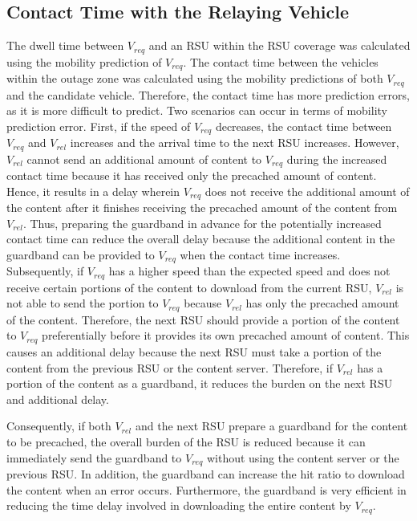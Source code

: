 \documentclass[electronics,aricle,accept,pdftex,moreauthors]{Definitions/mdpi}
\begin{document}
\subsection{Contact Time with the Relaying Vehicle} \label{sec4.2}
The dwell time between ${V}_{req}$ and an RSU within the RSU coverage was calculated using the mobility prediction of ${V}_{req}$. The contact time between the vehicles within the outage zone was calculated using the mobility predictions of both ${V}_{req}$ and the candidate vehicle. Therefore, the contact time has more prediction errors, as it is more difficult to predict. Two scenarios can occur in terms of mobility prediction error. First, if the speed of ${V}_{req}$ decreases, the contact time between ${V}_{req}$ and ${V}_{rel}$ increases and the arrival time to the next RSU increases. However, ${V}_{rel}$ cannot send an additional amount of content to ${V}_{req}$ during the increased contact time because it has received only the precached amount of content. Hence, it results in a delay wherein ${V}_{req}$ does not receive the additional amount of the content after it finishes receiving the precached amount of the content from ${V}_{rel}$. Thus, preparing the guardband in advance for the potentially increased contact time can reduce the overall delay because the additional content in the guardband can be provided to ${V}_{req}$ when the contact time increases. Subsequently, if ${V}_{req}$ has a higher speed than the expected speed and does not receive certain portions of the content to download from the current RSU, ${V}_{rel}$ is not able to send the portion to ${V}_{req}$ because ${V}_{rel}$ has only the precached amount of the content. Therefore, the next RSU should provide a portion of the content to ${V}_{req}$ preferentially before it provides its own precached amount of content. This causes an additional delay because the next RSU must take a portion of the content from the previous RSU or the content server. Therefore, if ${V}_{rel}$ has a portion of the content as a guardband, it reduces the burden on the next RSU and additional delay.

Consequently, if both ${V}_{rel}$ and the next RSU prepare a guardband for the content to be precached, the overall burden of the RSU is reduced because it can immediately send the guardband to ${V}_{req}$ without using the content server or the previous RSU. In addition, the guardband can increase the hit ratio to download the content when an error occurs. Furthermore, the guardband is very efficient in reducing the time delay involved in downloading the entire content by ${V}_{req}$.
\end{document}
